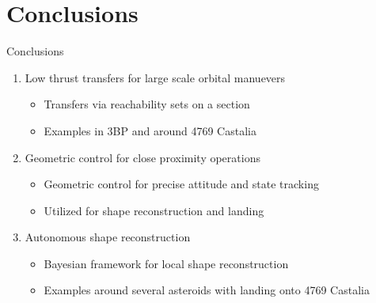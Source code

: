 \section{Conclusions}
\begin{frame}{Conclusions}
    \begin{enumerate}
        \item Low thrust transfers for large scale orbital manuevers 
            \pause
            \begin{alertblock}{}
                \begin{itemize}
                    \item Transfers via reachability sets on a \Poincare section
                    \item Examples in 3BP and around 4769 Castalia
                \end{itemize}
            \end{alertblock}
            \pause
        \item Geometric control for close proximity operations
            \pause
            \begin{alertblock}{}
                \begin{itemize}
                    \item Geometric control for precise attitude and state tracking
                    \item Utilized for shape reconstruction and landing
                \end{itemize}
            \end{alertblock}
            \pause
        \item Autonomous shape reconstruction
            \begin{alertblock}{}
                \begin{itemize}
                    \item Bayesian framework for local shape reconstruction
                    \item Examples around several asteroids with landing onto 4769 Castalia
                \end{itemize}
            \end{alertblock}
    \end{enumerate}
\end{frame}

